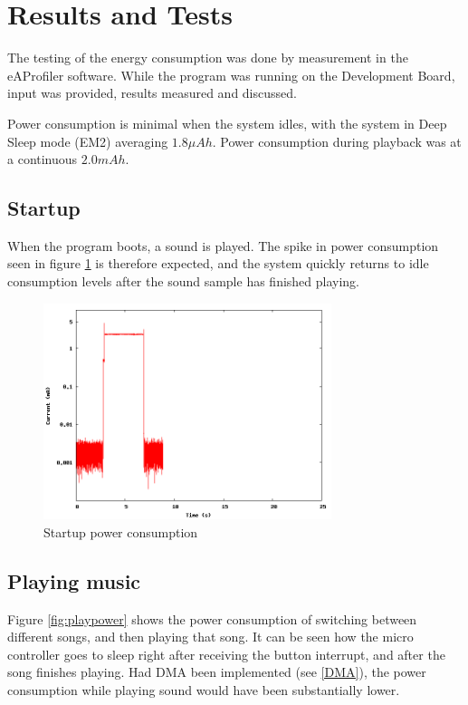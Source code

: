 \section{Results and Tests}

The testing of the energy consumption was done by measurement in the eAProfiler software.
While the program was running on the Development Board, input was provided, results measured and discussed.

Power consumption is minimal when the system idles, with the system in Deep Sleep mode (EM2) averaging $ 1.8 \mu Ah $. Power consumption during playback was at a continuous $ 2.0 mAh $.

\subsection{Startup}

When the program boots, a sound is played. The spike in power consumption seen in figure \ref{fig:startuppower} is therefore expected, and the system quickly returns to idle consumption levels after the sound sample has finished playing.

\begin{figure}[H]
\centering
\includegraphics[width=0.75\textwidth]{data/startup.png}
\caption{Startup power consumption}
\label{fig:startuppower}
\end{figure}

\subsection{Playing music}

Figure \ref{fig:playpower} shows the power consumption of switching between different songs, and then playing that song.
It can be seen how the micro controller goes to sleep right after receiving the button interrupt, and after the song finishes playing.
Had DMA been implemented (see \vref{DMA}), the power consumption while playing sound would have been substantially lower.

